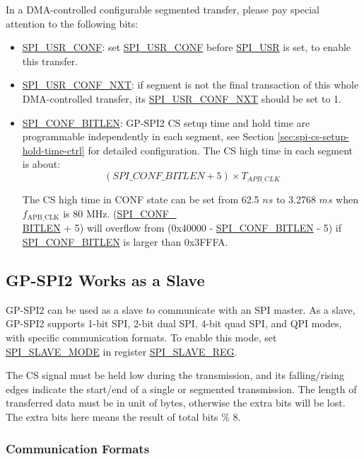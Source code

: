 \documentclass[main\_\_EN.tex]{subfiles}
\begin{document}
In a DMA-controlled configurable segmented transfer, please pay special attention to the following bits:
\begin{itemize}
    \item \hyperref[fielddesc:SPIUSRCONF]{SPI\_USR\_CONF}: set \hyperref[fielddesc:SPIUSRCONF]{SPI\_USR\_CONF} before \hyperref[fielddesc:SPIUSR]{SPI\_USR} is set, to enable this transfer.
    \item \hyperref[fielddesc:SPIUSRCONFNXT]{SPI\_USR\_CONF\_NXT}: if segment is not the final transaction of this whole DMA-controlled transfer, its \hyperref[fielddesc:SPIUSRCONFNXT]{SPI\_USR\_CONF\_NXT} should be set to 1.
    \item \hyperref[fielddesc:SPICONFBITLEN]{SPI\_CONF\_BITLEN}: GP-SPI2 CS setup time and hold time are programmable independently in each segment, see Section \ref{sec:spi-cs-setup-hold-time-ctrl} for detailed configuration. The CS high time in each segment is about:
    \[
    (\hyperref[fielddesc:SPICONFBITLEN]{SPI\_CONF\_BITLEN} + 5) \times T_{APB\_CLK}
    \]

The CS high time in CONF state can be set from 62.5 $ns$ to 3.2768 $ms$ when $f_{\textrm{APB\_CLK}}$ is 80 MHz.
(\hyperref[fielddesc:SPICONFBITLEN]{SPI\_CONF\_\\BITLEN} + 5) will overflow from (0x40000 - \hyperref[fielddesc:SPICONFBITLEN]{SPI\_CONF\_BITLEN} - 5) if \hyperref[fielddesc:SPICONFBITLEN]{SPI\_CONF\_BITLEN} is larger than 0x3FFFA.
\end{itemize}

\subsection{GP-SPI2 Works as a Slave}\label{sec:spi-func-descr-gp-spi2-slave}

GP-SPI2 can be used as a slave to communicate with an SPI master. As a slave, GP-SPI2 supports 1-bit SPI, 2-bit dual SPI, 4-bit quad SPI, and QPI modes, with specific communication formats. To enable this mode, set \hyperref[fielddesc:SPISLAVEMODE]{SPI\_SLAVE\_MODE} in register \hyperref[regdesc:SPISLAVEREG]{SPI\_SLAVE\_REG}.

The CS signal must be held low during the transmission, and its falling/rising edges indicate the start/end of a single or segmented transmission. The length of transferred data must be in unit of bytes, otherwise the extra bits will be lost. The extra bits here means the result of total bits \% 8.

\subsubsection{Communication Formats}\label{sec:spi-slave-communication-format}
\end{document}

